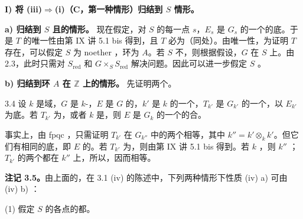 \textbf{I) 将 (iii)$\Rightarrow$(i)（C，第一种情形）归结到 $S$ 情形。}

\textbf{a) 归结到 $S$ 且的情形。}
现在假定，对 $S$ 的每一点 $s$，$E_s$ 是 $G_s$ 的一个的底。于是 $T$ 的唯一性由第 IX 讲 5.1 bis 得到，且 $T$ 必为（同处）。由唯一性，为证明 $T$ 存在，可以假定 $S$ 为 noether ，环为 $A$。若 $S$ 不，则根据假设，$G$ 在 $S$ 上。由 2.3，此时只需对 $S_{\mathrm{red}}$ 和 $G\times_S S_{\mathrm{red}}$ 解决问题。因此可以进一步假定 $S$ 。

\textbf{b) 归结到环 $A$ 在 $\mathbb Z$ 上的情形。}
先证明两个。
\begin{SGAresult}{}{3.4}
设 $k$ 是域，$G$ 是 $k$-，$E$ 是 $G$ 的，$k'$ 是 $k$ 的一个，$T_{k'}$ 是 $G_{k'}$ 的一个，以 $E_{k'}$ 为底。若 $T_{k'}$ 为，或者 $k$ 是，则 $E$ 是 $G_k$ 的一个的合。
\end{SGAresult}
事实上，由 fpqc ，只需证明 $T_{k'}$ 在 $G_{k''}$ 中的两个相等，其中 $k''=k'\otimes_k k'$。但它们有相同的底，即 $E$ 的。若 $T_{k'}$ 为，则由第 IX 讲 5.1 bis 得到。若 $k$ ，则 $k''$ ；$T_{k'}$ 的两个都在 $k''$ 上，所以，因而相等。

\textbf{注记 3.5。}由上面的，在 3.1 (iv) 的陈述中，下列两种情形下性质 (iv) a) 可由 (iv) b) ：

(1) 假定 $S$ 的各点的都。

